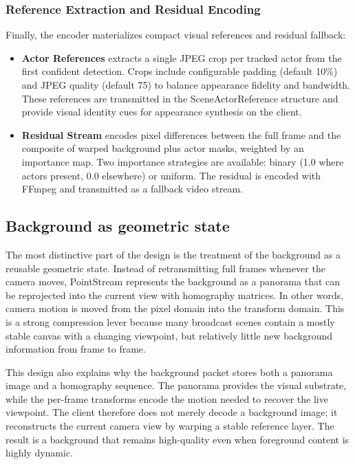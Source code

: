 \documentclass[manuscript, screen]{acmart}
\begin{document}
\subsubsection{Reference Extraction and Residual Encoding}
Finally, the encoder materializes compact visual references and residual fallback:
\begin{itemize}[topsep=0pt,itemsep=0pt,leftmargin=*]
    \item \textbf{Actor References} extracts a single JPEG crop per tracked actor from the first confident detection. Crops include configurable padding (default 10\%) and JPEG quality (default 75) to balance appearance fidelity and bandwidth. These references are transmitted in the SceneActorReference structure and provide visual identity cues for appearance synthesis on the client.
    \item \textbf{Residual Stream} encodes pixel differences between the full frame and the composite of warped background plus actor masks, weighted by an importance map. Two importance strategies are available: binary (1.0 where actors present, 0.0 elsewhere) or uniform. The residual is encoded with FFmpeg and transmitted as a fallback video stream.
\end{itemize}

\subsection{Background as geometric state}
The most distinctive part of the design is the treatment of the background as a reusable geometric state. Instead of retransmitting full frames whenever the camera moves, PointStream represents the background as a panorama that can be reprojected into the current view with homography matrices. In other words, camera motion is moved from the pixel domain into the transform domain. This is a strong compression lever because many broadcast scenes contain a mostly stable canvas with a changing viewpoint, but relatively little new background information from frame to frame.

This design also explains why the background packet stores both a panorama image and a homography sequence. The panorama provides the visual substrate, while the per-frame transforms encode the motion needed to recover the live viewpoint. The client therefore does not merely decode a background image; it reconstructs the current camera view by warping a stable reference layer. The result is a background that remains high-quality even when foreground content is highly dynamic.
\end{document}
